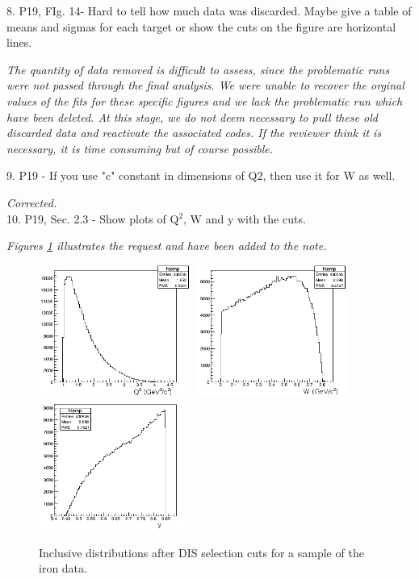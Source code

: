 \documentclass[12pt]{article}
\begin{document}
8.
P19, FIg. 14- Hard to tell how much data was discarded.  Maybe give a table of means and 
sigmas for each target or show the cuts on the figure are horizontal lines.

{\it The quantity of data removed is difficult to assess, since the problematic runs were
not passed through the final analysis. We were unable to recover the orginal values of the
fits for these specific figures and we 
lack the problematic run which have been deleted. At this stage, we do not deem necessary
to pull these old discarded data and reactivate the associated codes. If the reviewer
think it is necessary, it is time consuming but of course possible.}

9.
P19 - If you use "c" constant in dimensions of Q2, then use it for W as well.

{\it Corrected.} \\

10.
P19, Sec. 2.3 - Show plots of Q$^2$, W and y with the cuts.

{\it Figures \ref{DISKine} illustrates the request and have been added to the note.} \\

\begin{figure}[tbp]
\centering
\includegraphics[width=5cm] {answer-fig/DIS-Q2.png} 
\includegraphics[width=5cm] {answer-fig/DIS-w.png} 
\includegraphics[width=5cm] {answer-fig/DIS-y.png} 
\caption {Inclusive distributions after DIS selection cuts for a sample of the iron
data.}
\label{DISKine}
\end{figure}
\end{document}
